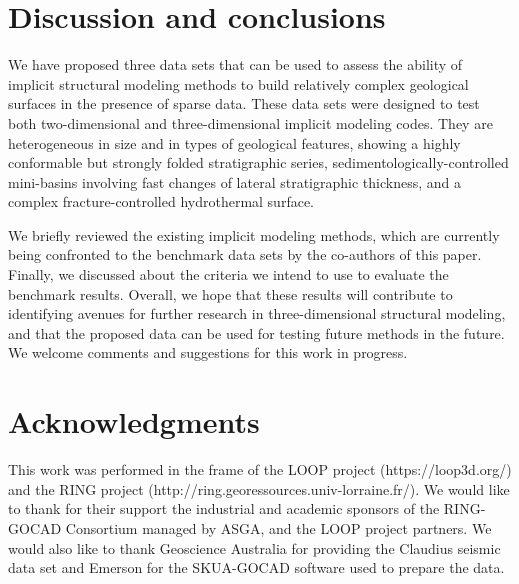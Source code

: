 \documentclass[final]{ring20}
\begin{document}


\section*{Discussion and conclusions}
\label{sec:conclu}
We have proposed three data sets that can be used to assess the ability of implicit structural modeling methods to build relatively complex geological surfaces in the presence of sparse data. These data sets were designed to test both two-dimensional and three-dimensional implicit modeling codes. They are heterogeneous in size and in types of geological features, showing a highly conformable but strongly folded stratigraphic series, sedimentologically-controlled mini-basins involving fast changes of lateral stratigraphic thickness, and a complex fracture-controlled hydrothermal surface. 

We briefly reviewed the existing implicit modeling methods, which are currently being confronted to the benchmark data sets by the co-authors of this paper. Finally, we discussed about the criteria we intend to use to evaluate the benchmark results. 
Overall, we hope that these results will contribute to identifying avenues for further research in three-dimensional structural modeling, and that the proposed data can be used for testing future methods in the future. We welcome comments and suggestions for this work in progress. 

\section*{Acknowledgments}

This work was performed in the frame of the LOOP project (https://loop3d.org/) and the RING project (http://ring.georessources.univ-lorraine.fr/). We would like to thank for their support the industrial and academic sponsors of the RING-GOCAD Consortium managed by ASGA, and the LOOP project partners. We would also like to thank Geoscience Australia for providing the Claudius seismic data set and Emerson for the SKUA-GOCAD software used to prepare the data. 


\end{document}

